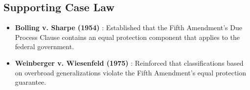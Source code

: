 \subsection{Supporting Case Law}
\begin{itemize}
    \item \textbf{Bolling v. Sharpe (1954)} \cite{bolling1954}: Established that the Fifth Amendment's Due Process Clause contains an equal protection component that applies to the federal government.
    \item \textbf{Weinberger v. Wiesenfeld (1975)} \cite{weinberger1975}: Reinforced that classifications based on overbroad generalizations violate the Fifth Amendment's equal protection guarantee.
\end{itemize}
